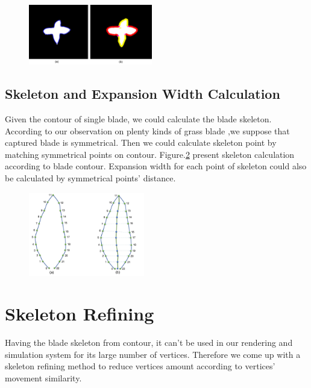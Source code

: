 \documentclass[10pt,journal,compsoc]{IEEEtran}
\begin{document}
\begin{figure}
    \centering
    \includegraphics[width=0.48\textwidth]{figs/contour_partition.jpg}
    \label{fig:partition}
\end{figure}

\subsection{Skeleton and Expansion Width Calculation}
Given the contour of single blade, we could calculate the blade skeleton. According to our observation on plenty kinds of grass blade ,we suppose that captured blade is symmetrical. Then we could calculate skeleton point by matching symmetrical points on contour. Figure.\ref{fig:skeleton} present skeleton calculation according to blade contour. Expansion width for each point of skeleton could also be calculated by symmetrical points' distance.

\begin{figure}
    \centering
    \includegraphics[width=0.45\textwidth]{figs/skeletoncal.jpg}
    \label{fig:skeleton}
\end{figure}

\section{Skeleton Refining}\label{sec:Refining}
Having the blade skeleton from contour, it can't be used in our rendering and simulation system for its large number of vertices. Therefore we come up with a skeleton refining method to reduce vertices amount according to vertices' movement similarity.\\
\end{document}
